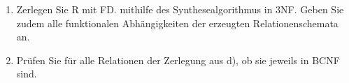 \documentclass{lehramt-informatik-aufgabe}
\begin{document}
\begin{enumerate}
\begin{enumerate}
\begin{liAntwort}

\end{liAntwort}
\end{enumerate}


\item Zerlegen Sie R mit FD. mithilfe des Synthesealgorithmus in 3NF.
Geben Sie zudem alle funktionalen Abhängigkeiten der erzeugten
Relationenschemata an.

\begin{liAntwort}

\end{liAntwort}


\item Prüfen Sie für alle Relationen der Zerlegung aus d), ob sie
jeweils in BCNF sind.

\begin{liAntwort}

\end{liAntwort}

\end{enumerate}
\end{document}
